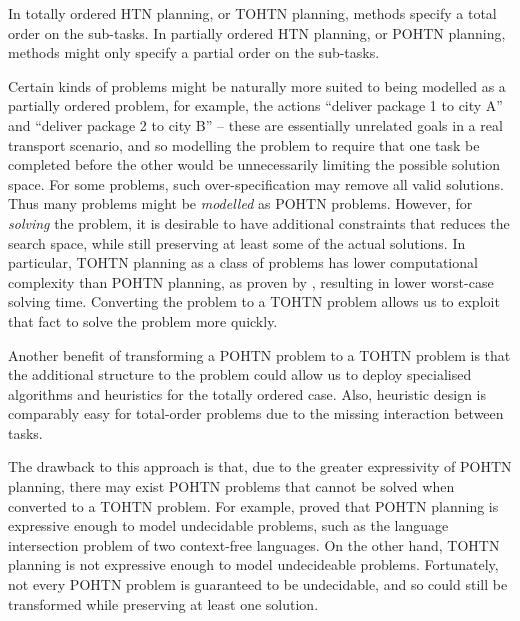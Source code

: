 \documentclass[letterpaper]{article}
\begin{document}
In totally ordered HTN planning, or TOHTN planning, methods specify a total order on the sub-tasks. In partially ordered HTN planning, or POHTN planning, methods might only specify a partial order on the sub-tasks. 

Certain kinds of problems might be naturally more suited to being modelled as a partially ordered problem, for example, the actions \enquote{deliver package 1 to city A} and \enquote{deliver package 2 to city B} -- these are essentially unrelated goals in a real transport scenario, and so modelling the problem to require that one task be completed before the other would be unnecessarily limiting the possible solution space. For some problems, such over-specification may remove all valid solutions. Thus many problems might be \emph{modelled} as POHTN problems. However, for \emph{solving} the problem, it is desirable to have additional constraints that reduces the search space, while still preserving at least some of the actual solutions. In particular, TOHTN planning as a class of problems has lower computational complexity than POHTN planning, as proven by \cite{ErolHTNExpressivity}, resulting in lower worst-case solving time. Converting the problem to a TOHTN problem allows us to exploit that fact to solve the problem more quickly.

Another benefit of transforming a POHTN problem to a TOHTN problem is that the additional structure to the problem could allow us to deploy specialised algorithms and heuristics for the totally ordered case. Also, heuristic design is comparably easy for total-order problems due to the missing interaction between tasks.

The drawback to this approach is that, due to the greater expressivity of POHTN planning, there may exist POHTN problems that cannot be solved when converted to a TOHTN problem. For example, \cite{ErolHTNExpressivity} proved that POHTN planning is expressive enough to model undecidable problems, such as the language intersection problem of two context-free languages. On the other hand, TOHTN planning is not expressive enough to model undecideable problems. Fortunately, not every POHTN problem is guaranteed to be undecidable, and so could still be transformed while preserving at least one solution.

\end{document}
